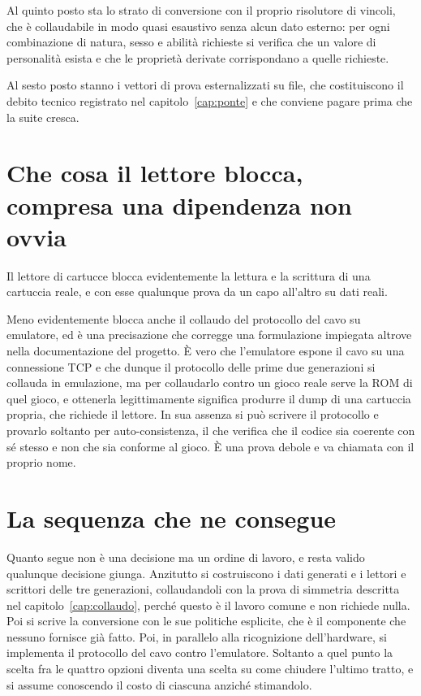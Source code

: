 Al quinto posto sta lo strato di conversione con il proprio risolutore di vincoli, che è collaudabile in modo quasi esaustivo senza alcun dato esterno: per ogni combinazione di natura, sesso e abilità richieste si verifica che un valore di personalità esista e che le proprietà derivate corrispondano a quelle richieste.

Al sesto posto stanno i vettori di prova esternalizzati su file, che costituiscono il debito tecnico registrato nel capitolo~\ref{cap:ponte} e che conviene pagare prima che la suite cresca.

\section{Che cosa il lettore blocca, compresa una dipendenza non ovvia}

Il lettore di cartucce blocca evidentemente la lettura e la scrittura di una cartuccia reale, e con esse qualunque prova da un capo all'altro su dati reali.

Meno evidentemente blocca anche il collaudo del protocollo del cavo su emulatore, ed è una precisazione che corregge una formulazione impiegata altrove nella documentazione del progetto. È vero che l'emulatore espone il cavo su una connessione TCP e che dunque il protocollo delle prime due generazioni si collauda in emulazione, ma per collaudarlo contro un gioco reale serve la ROM di quel gioco, e ottenerla legittimamente significa produrre il dump di una cartuccia propria, che richiede il lettore. In sua assenza si può scrivere il protocollo e provarlo soltanto per auto-consistenza, il che verifica che il codice sia coerente con sé stesso e non che sia conforme al gioco. È una prova debole e va chiamata con il proprio nome.

\section{La sequenza che ne consegue}

Quanto segue non è una decisione ma un ordine di lavoro, e resta valido qualunque decisione giunga. Anzitutto si costruiscono i dati generati e i lettori e scrittori delle tre generazioni, collaudandoli con la prova di simmetria descritta nel capitolo~\ref{cap:collaudo}, perché questo è il lavoro comune e non richiede nulla. Poi si scrive la conversione con le sue politiche esplicite, che è il componente che nessuno fornisce già fatto. Poi, in parallelo alla ricognizione dell'hardware, si implementa il protocollo del cavo contro l'emulatore. Soltanto a quel punto la scelta fra le quattro opzioni diventa una scelta su come chiudere l'ultimo tratto, e si assume conoscendo il costo di ciascuna anziché stimandolo.
